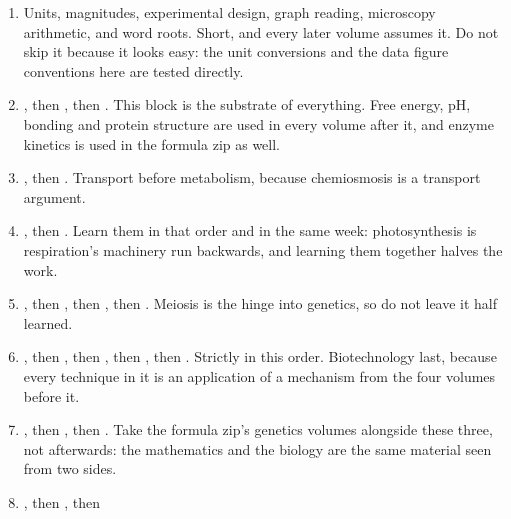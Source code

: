 \begin{keybox}[title={The dependency order for the core syllabus}]
\begin{enumerate}
\item {} Units, magnitudes,
      experimental design, graph reading, microscopy arithmetic, and word roots. Short,
      and every later volume assumes it. Do not skip it because it looks easy: the
      unit conversions and the data figure conventions here are tested directly.
\item {}, then , then
      . This block is the substrate of
      everything. Free energy, pH, bonding and protein structure are used in every
      volume after it, and enzyme kinetics is used in the formula zip as well.
\item {}, then . Transport before metabolism, because chemiosmosis is a transport
      argument.
\item {}, then . Learn them
      in that order and in the same week: photosynthesis is respiration's machinery run
      backwards, and learning them together halves the work.
\item {}, then , then , then . Meiosis is the hinge into genetics,
      so do not leave it half learned.
\item {}, then , then
      , then , then . Strictly
      in this order. Biotechnology last, because every technique in it is an
      application of a mechanism from the four volumes before it.
\item {}, then , then . Take the formula zip's genetics volumes alongside
      these three, not afterwards: the mathematics and the biology are the same
      material seen from two sides.
\item {}, then , then

\end{enumerate}
\end{keybox}
